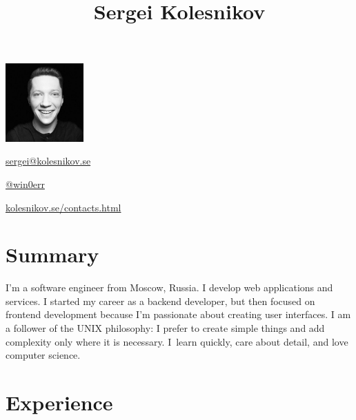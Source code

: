 \documentclass[10pt]{article}
\begin{document}
\begin{floatingfigure}[r]{3cm}
	\vspace{-.5\baselineskip}
	\includegraphics[width=3cm]{userpic}
\end{floatingfigure}

\title{Sergei Kolesnikov}
\vspace{-.5\baselineskip}

\begin{horizontalitemize}
	\item \href{mailto:sergei@kolesnikov.se}{sergei@kolesnikov.se}
	\item \href{https://t.me/win0err}{@win0err}
	\item \href{https://kolesnikov.se/contacts.html}{kolesnikov.se/contacts.html}
\end{horizontalitemize}

\begin{summary}
\end{summary}


\vspace{-2\baselineskip}
\section{Summary}

I'm a software engineer from Moscow, Russia. I develop web applications and services.
I started my career as a backend developer, but then focused on frontend development because I'm passionate about creating user interfaces.
I am a follower of the UNIX philosophy: I prefer to create simple things and add complexity only where it is necessary.
I~learn quickly, care about detail, and love computer science.


\section{Experience}
\end{document}
